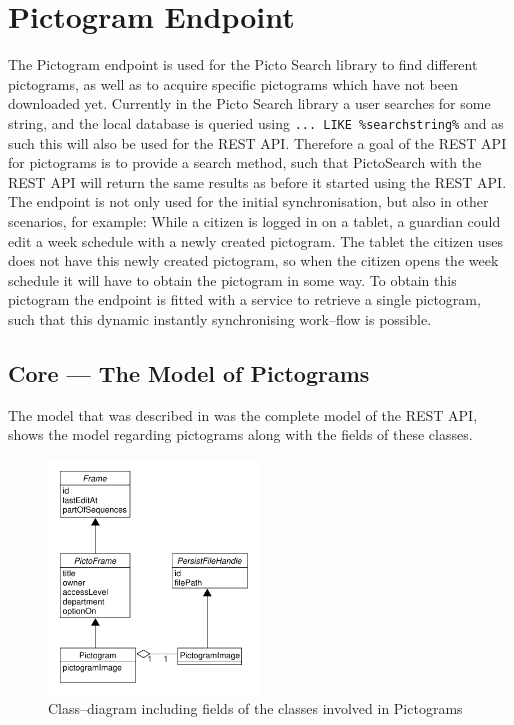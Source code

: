 \section{Pictogram Endpoint}\label{sec:pictogramendpoint}
\begin{center}
\end{center}

The Pictogram endpoint is used for the Picto Search library to find different pictograms, as well as to acquire specific pictograms which have not been downloaded yet.
Currently in the Picto Search library a user searches for some string, and the local database is queried using \texttt{... LIKE \%searchstring\%} and as such this will also be used for the REST API.
Therefore a goal of the REST API for pictograms is to provide a search method, such that PictoSearch with the REST API will return the same results as before it started using the REST API. 
The endpoint is not only used for the initial synchronisation, but also in other scenarios, for example:
While a citizen is logged in on a tablet, a guardian could edit a week schedule with a newly created pictogram.
The tablet the citizen uses does not have this newly created pictogram, so when the citizen opens the week schedule it will have to obtain the pictogram in some way.
To obtain this pictogram the endpoint is fitted with a service to retrieve a single pictogram, such that this dynamic instantly synchronising work--flow is possible. 

\subsection{Core --- The Model of Pictograms}\label{subsec:pictomodel}
The model that was described in  was the complete model of the REST API,  shows the model regarding pictograms along with the fields of these classes.

\begin{figure}[!htb]
    \centering
    \includegraphics[width=0.50\textwidth]{figures/pictogrammodel.pdf}
    \caption{Class--diagram including fields of the classes involved in Pictograms}\label{fig:pictogramModel}
\end{figure}

